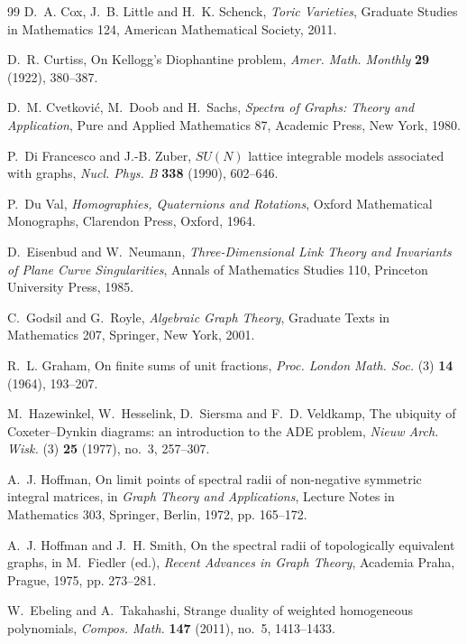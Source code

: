 \documentclass[11pt,a4paper]{article}
\theoremstyle{definition}
\theoremstyle{plain}
\begin{document}
\begin{thebibliography}{99}
D.~A. Cox, J.~B. Little and H.~K. Schenck, \emph{Toric Varieties}, Graduate Studies in Mathematics 124, American Mathematical Society, 2011.

D.~R. Curtiss, On Kellogg's Diophantine problem, \emph{Amer. Math. Monthly} \textbf{29} (1922), 380--387.

D.~M. Cvetkovi\'c, M.~Doob and H.~Sachs, \emph{Spectra of Graphs: Theory and Application}, Pure and Applied Mathematics 87, Academic Press, New York, 1980.

P.~Di Francesco and J.-B. Zuber, $SU(N)$ lattice integrable models associated with graphs, \emph{Nucl. Phys. B} \textbf{338} (1990), 602--646.

P.~Du Val, \emph{Homographies, Quaternions and Rotations}, Oxford Mathematical Monographs, Clarendon Press, Oxford, 1964.

D.~Eisenbud and W.~Neumann, \emph{Three-Dimensional Link Theory and Invariants of Plane Curve Singularities}, Annals of Mathematics Studies 110, Princeton University Press, 1985.

C.~Godsil and G.~Royle, \emph{Algebraic Graph Theory}, Graduate Texts in Mathematics 207, Springer, New York, 2001.

R.~L. Graham, On finite sums of unit fractions, \emph{Proc. London Math. Soc.} (3) \textbf{14} (1964), 193--207.

M.~Hazewinkel, W.~Hesselink, D.~Siersma and F.~D. Veldkamp, The ubiquity of Coxeter--Dynkin diagrams: an introduction to the ADE problem, \emph{Nieuw Arch. Wisk.} (3) \textbf{25} (1977), no.~3, 257--307.

A.~J. Hoffman, On limit points of spectral radii of non-negative symmetric integral matrices, in \emph{Graph Theory and Applications}, Lecture Notes in Mathematics 303, Springer, Berlin, 1972, pp. 165--172.

A.~J. Hoffman and J.~H. Smith, On the spectral radii of topologically equivalent graphs, in M.~Fiedler (ed.), \emph{Recent Advances in Graph Theory}, Academia Praha, Prague, 1975, pp. 273--281.


W.~Ebeling and A.~Takahashi, Strange duality of weighted homogeneous polynomials, \emph{Compos. Math.} \textbf{147} (2011), no.~5, 1413--1433.



\end{thebibliography}
\end{document}
